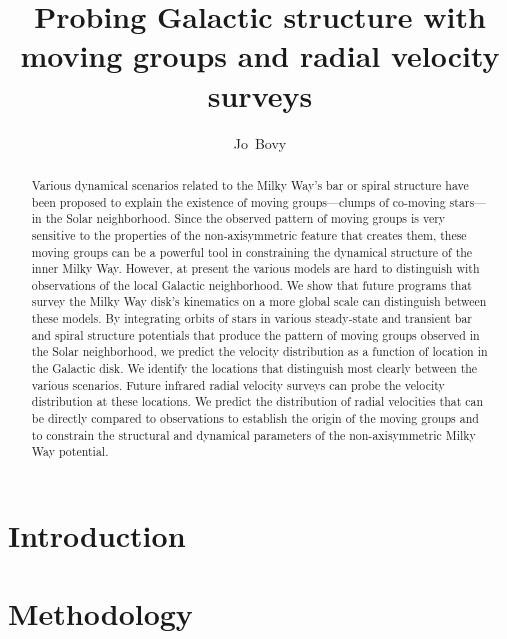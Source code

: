 \documentclass[12pt,preprint]{aastex}
\begin{document}
\title{Probing Galactic structure with moving groups and radial velocity surveys}
\author{Jo~Bovy}%

\begin{abstract}
Various dynamical scenarios related to the Milky Way's bar or spiral
structure have been proposed to explain the existence of moving
groups---clumps of co-moving stars---in the Solar neighborhood. Since
the observed pattern of moving groups is very sensitive to the
properties of the non-axisymmetric feature that creates them, these
moving groups can be a powerful tool in constraining the dynamical
structure of the inner Milky Way. However, at present the various
models are hard to distinguish with observations of the local Galactic
neighborhood. We show that future programs that survey the Milky Way
disk's kinematics on a more global scale can distinguish between these
models. By integrating orbits of stars in various steady-state and
transient bar and spiral structure potentials that produce the pattern
of moving groups observed in the Solar neighborhood, we predict the
velocity distribution as a function of location in the Galactic
disk. We identify the locations that distinguish most clearly between
the various scenarios. Future infrared radial velocity surveys can
probe the velocity distribution at these locations. We predict the
distribution of radial velocities that can be directly compared to
observations to establish the origin of the moving groups and to
constrain the structural and dynamical parameters of the
non-axisymmetric Milky Way potential.
\end{abstract}


\section{Introduction}




\section{Methodology}
\end{document}
